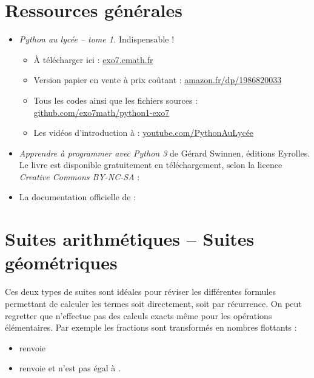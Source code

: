 \documentclass[11pt,class=report,crop=false]{standalone}
\begin{document}



\section*{Ressources générales}

\begin{itemize}
	\item \emph{Python au lycée -- tome 1.} Indispensable !
	\begin{itemize}
		\item \`A télécharger ici : 
		\href{http://exo7.emath.fr/}{exo7.emath.fr}
		\item Version papier en vente à prix coûtant : \href{https://www.amazon.fr/dp/1986820033}{amazon.fr/dp/1986820033}
		\item Tous les codes \Python{} ainsi que les fichiers sources :  \href{https://github.com/exo7math/python1-exo7}{github.com/exo7math/python1-exo7}
		\item Les vidéos d'introduction à \Python{} : \href{https://www.youtube.com/channel/UC6PiFyqBiUjiJ7Q3DRSW2Wg}{youtube.com/PythonAuLycée}
	\end{itemize}
	
	  \item \emph{Apprendre à programmer avec Python 3} de Gérard Swinnen, éditions Eyrolles. Le livre est disponible gratuitement en téléchargement, selon la licence \emph{Creative Commons BY-NC-SA} :	  
  \item La documentation officielle de \Python{} :  

\end{itemize}


\section{Suites arithmétiques -- Suites géométriques}

Ces deux types de suites sont idéales pour réviser les différentes formules permettant de calculer les termes soit directement, soit par récurrence.
On peut regretter que \Python{} n'effectue pas des calculs exacts même pour les opérations élémentaires. Par exemple les fractions sont transformés en nombres flottants :
\begin{itemize}
	\item {} renvoie 
	\item {} renvoie  et n'est pas égal à .
\end{itemize}
\end{document}
